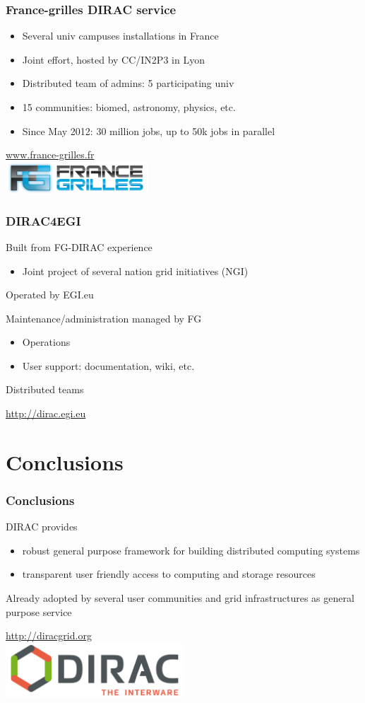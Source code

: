 \documentclass[14pt]{beamer}
\begin{document}
\begin{frame}
\frametitle{France-grilles DIRAC service}
\begin{itemize}
\item Several univ campuses installations in France
\item Joint effort, hosted by CC/IN2P3 in Lyon
\item Distributed team of admins: 5 participating univ
\item 15 communities: biomed, astronomy, physics, etc.
\item Since May 2012: 30 million jobs, up to 50k jobs in parallel
\end{itemize}

\centering
\url{www.france-grilles.fr}\\
\includegraphics[width=0.4\textwidth]{fg.png}

\end{frame}

\begin{frame}
\frametitle{DIRAC4EGI}
Built from FG-DIRAC experience
\begin{itemize}
\item Joint project of several nation grid initiatives (NGI)
\end{itemize}
Operated by EGI.eu

Maintenance/administration managed by FG
\begin{itemize}
\item Operations
\item User support: documentation, wiki, etc.
\end{itemize}
Distributed teams

\url{http://dirac.egi.eu}
\end{frame}

\section{Conclusions}
\begin{frame}
\frametitle{Conclusions}
DIRAC provides
\begin{itemize}
\item robust general purpose framework for building distributed computing systems
\pause
\item transparent user friendly access to computing and storage resources
\end{itemize}
\pause
Already adopted by several user communities and grid infrastructures as general purpose service

\centering 
\url{http://diracgrid.org}\\
\includegraphics[width=0.5\textwidth]{Dirac_logo_RGB.png}

\end{frame}
\end{document}
